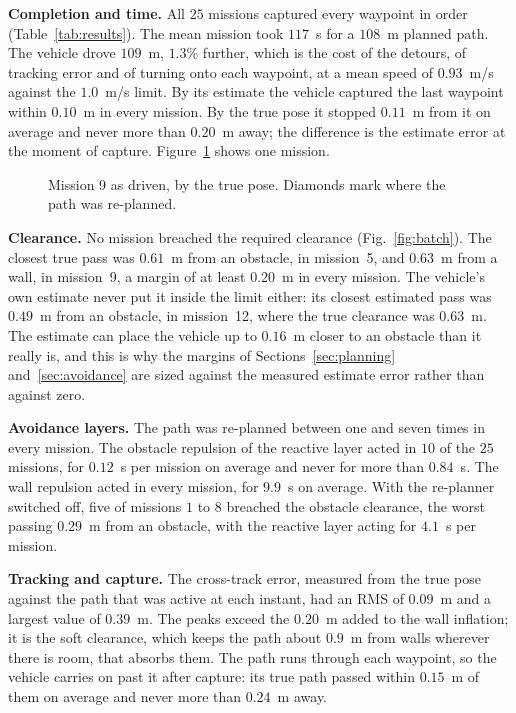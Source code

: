 \textbf{Completion and time.} All $25$ missions captured every waypoint
in order (Table~\ref{tab:results}). The mean mission took $117$~s for a
$108$~m planned path. The vehicle drove $109$~m, $1.3$\% further, which
is the cost of the detours, of tracking error and of turning onto each
waypoint, at a mean speed of $0.93$~m/s against the $1.0$~m/s limit. By
its estimate the vehicle captured the last waypoint within $0.10$~m in
every mission. By the true pose it stopped $0.11$~m from it on average
and never more than $0.20$~m away; the difference is the estimate error
at the moment of capture. Figure~\ref{fig:mission} shows one mission.

\begin{figure}[!t]
    \centering
    \caption{Mission 9 as driven, by the true pose. Diamonds mark where
    the path was re-planned.}
    \label{fig:mission}
\end{figure}

\textbf{Clearance.} No mission breached the required clearance
(Fig.~\ref{fig:batch}). The closest true pass was $0.61$~m from an
obstacle, in mission~5, and $0.63$~m from a wall, in mission~9, a
margin of at least $0.20$~m in every mission. The vehicle's own
estimate never put it inside the limit either: its closest estimated
pass was $0.49$~m from an obstacle, in mission~12, where the true
clearance was $0.63$~m. The estimate can place the vehicle up to
$0.16$~m closer to an obstacle than it really is, and this is why the
margins of Sections~\ref{sec:planning} and~\ref{sec:avoidance} are
sized against the measured estimate error rather than against zero.

\textbf{Avoidance layers.} The path was re-planned between one and seven
times in every mission. The obstacle repulsion of the reactive
layer acted in $10$ of the $25$ missions, for $0.12$~s per mission on
average and never for more than $0.84$~s. The wall repulsion acted in
every mission, for $9.9$~s on average. With the re-planner switched off,
five of missions $1$ to $8$ breached the obstacle clearance, the worst
passing $0.29$~m from an obstacle, with the reactive layer acting for
$4.1$~s per mission.

\textbf{Tracking and capture.} The cross-track error, measured from the
true pose against the path that was active at each instant, had an RMS
of $0.09$~m and a largest value of $0.39$~m.
The peaks exceed the $0.20$~m added to the wall inflation; it is the
soft clearance, which keeps the path about $0.9$~m from walls wherever
there is room, that absorbs them. The path runs through each waypoint, so the vehicle
carries on past it after capture: its true path passed within $0.15$~m
of them on average and never more than $0.24$~m away.

